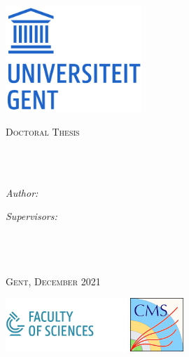 \begin{titlepage}
\includegraphics[height=4cm]{Figures/logo_Ugent}\\


\begin{center}
\vspace*{.01\textheight}
{\scshape\huge \univname\par}\vspace{1.5cm} %
\textsc{\Large Doctoral Thesis}\\[0.5cm] %

\HRule \\[0.4cm] %
{\huge \bfseries \ttitle\par}\vspace{0.4cm} %
\HRule \\[1.5cm] %
 
\begin{minipage}[t]{0.4\textwidth}
\begin{flushleft} \Large
\emph{Author:}\\
{\authorname} %
\end{flushleft}
\end{minipage}
\begin{minipage}[t]{0.4\textwidth}
\begin{flushright} \Large
\emph{Supervisors:} \\
{\supname} \\ 
{\cosupname} \\ 
\end{flushright}
\end{minipage}\\[1cm]
 
\vspace{8mm}
{\scshape \Large Gent, December 2021}\\[1cm] %
\vspace{8mm}


\includegraphics[clip,trim=0.cm 0.4cm 0.cm 0.4cm, height=2cm]{Figures/UGent_WE_logo.png}
\hfill
\includegraphics[height=2cm]{Figures/CMSlogo.png}



\end{center}
\end{titlepage}